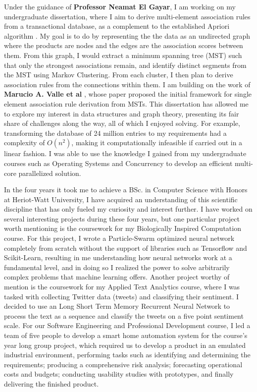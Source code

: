 \documentclass[a4paper,11pt]{article}
\newcommand{\supervisor}{\textbf{Professor Neamat El Gayar}}
\newcommand{\hw}{Heriot-Watt University}
\begin{document}
Under the guidance of \supervisor, I am working on my undergraduate dissertation, where I aim to derive multi-element association rules from a transactional database, as a complement to the established Apriori algorithm \cite{apriori}. My goal is to do by representing the the data as an undirected graph where the products are nodes and the edges are the association scores between them. From this graph, I would extract a minimum spanning tree (MST) such that only the strongest associations remain, and identify distinct segments from the MST using Markov Clustering. From each cluster, I then plan to derive association rules from the connections within them. I am building on the work of \textbf{Marucio A. Valle et al} \cite{mst_paper}, whose paper proposed the initial framework for single element association rule derivation from MSTs. This dissertation has allowed me to explore my interest in data structures and graph theory, presenting its fair share of challenges along the way, all of which I enjoyed solving. For example, transforming the database of 24 million entries to my requirements had a complexity of $O(n^2)$, making it computationally infeasible if carried out in a linear fashion. I was able to use the knowledge I gained from my undergraduate courses such as Operating Systems and Concurrency to develop an efficient multi-core parallelized solution.

In the four years it took me to achieve a BSc. in Computer Science with Honors at \hw, I have acquired an understanding of this scientific discipline that has only fueled my curiosity and interest further. I have worked on several interesting projects during these four years, but one particular project worth mentioning is the coursework for my Biologically Inspired Computation course. For this project, I wrote a Particle-Swarm optimized neural network completely from scratch without the support of libraries such as Tensorflow and Scikit-Learn, resulting in me understanding how neural networks work at a fundamental level, and in doing so I realized the power to solve arbitrarily complex problems that machine learning offers. Another project worthy of mention is the coursework for my Applied Text Analytics course, where I was tasked with collecting Twitter data (tweets) and classifying their sentiment.  I decided to use an Long Short Term Memory Recurrent Neural Network to process the text as a sequence and classify the tweets on a five point sentiment scale.  For our Software Engineering and Professional Development course, I led a team of five people to develop a smart home automation system for the course's year long group project, which required us to develop a product in an emulated industrial environment,  performing tasks such as identifying and determining the requirements; producing a comprehensive risk analysis; forecasting operational costs and budgets; conducting usability studies with prototypes, and finally delivering the finished product.
\end{document}

